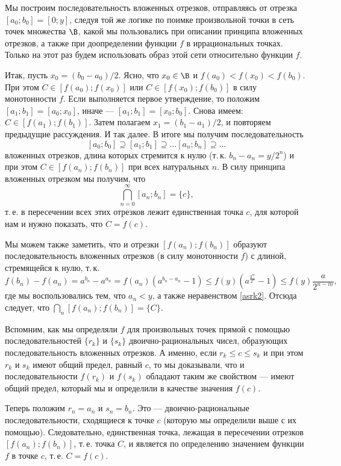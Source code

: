\begin{enumerate}
Мы построим последовательность вложенных отрезков, отправляясь от отрезка $[a_0;b_0]=[0;y]$, следуя той же логике по поимке произвольной точки в сеть точек множества $\B$, какой мы пользовались при описании принципа вложенных отрезков, а также при доопределении функции $f$ в иррациональных точках.
Только на этот раз будем использовать образ этой сети относительно функции $f$.

Итак, пусть $x_0=(b_0-a_0)/2$. Ясно, что $x_0\in \B$ и $f(a_0)<f(x_0)<f(b_0)$. При этом $C\in[f(a_0);f(x_0)]$ или $C\in[f(x_0);f(b_0)]$ в силу монотонности $f$. Если выполняется первое утверждение, то положим $[a_1;b_1]=[a_0;x_0]$, иначе --- $[a_1;b_1]=[x_0;b_0]$. Снова имеем: $C\in[f(a_1);f(b_1)]$. Затем полагаем $x_1=(b_1-a_1)/2$, и повторяем предыдущие рассуждения. И так далее. В итоге мы получим последовательность
$$
[a_0;b_0]\supseteq [a_1;b_1]\supseteq\dots[a_n;b_n]\supseteq\dots
$$
вложенных отрезков, длина которых стремится к нулю (т.\,к. $b_n-a_n=y/2^n$) и при этом $C\in[f(a_n);f(b_n)]$ при всех натуральных $n$. В силу принципа вложенных отрезком мы получим, что
$$
\bigcap\limits_{n=0}^\infty[a_n;b_n]=\{c\},
$$
т.\,е. в пересечении всех этих отрезков лежит единственная точка $c$, для которой нам и нужно показать, что $C=f(c)$.

Мы можем также заметить, что и отрезки $[f(a_n);f(b_n)]$ образуют последовательность вложенных отрезков (в силу монотонности $f$) с длиной, стремящейся к нулю, т.\,к.
$$
f(b_n)-f(a_n) = a^{b_n}-a^{a_n}=f(a_n)(a^{b_n-a_n}-1)\le f(y)(a^{\frac{2^m}{2^n}}-1)\le f(y)\frac{a}{2^{n-m}},
$$
где мы воспользовались тем, что $a_n<y$, а также неравенством \eqref{asrk2}. Отсюда следует, что $\bigcap_n[f(a_n);f(b_n)]=\{C\}$.

Вспомним, как мы определяли $f$ для произвольных точек прямой с помощью последовательностей $\{r_k\}$ и $\{s_k\}$ двоично-рациональных чисел, образующих последовательность вложенных отрезков. А именно, если $r_k\le c\le s_k$ и при этом $r_k$ и $s_k$ имеют общий предел, равный $c$, то мы доказывали, что и последовательности $f(r_k)$ и $f(s_k)$ обладают таким же свойством --- имеют общий предел, который мы и определили в качестве значения $f(c)$.

Теперь положим $r_n=a_n$ и $s_n=b_n$. Это --- двоично-рациональные последовательности, сходящиеся к точке $c$ (которую мы определили выше с их помощью). Следовательно, единственная точка, лежащая в пересечении отрезков $[f(a_n);f(b_n)]$, т.\,е. точка $C$, и является по определению значением функции $f$ в точке $c$, т.\,е. $C=f(c)$.


\end{enumerate}
